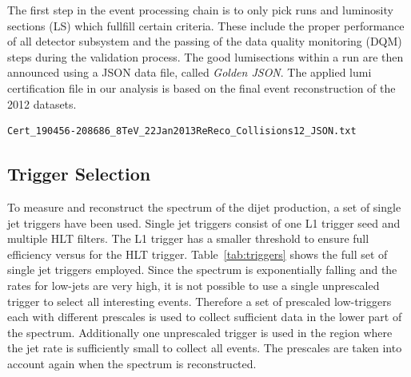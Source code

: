 The first step in the event processing chain is to only pick runs and
luminosity sections (LS) which fullfill certain criteria. These include the
proper performance of all detector subsystem and the passing of the data quality
monitoring (DQM) steps during the validation process. The good lumisections
within a run are then announced using a JSON data file, called \textit{Golden
JSON}. The applied lumi certification file in our analysis is based on the final
event reconstruction of the 2012 datasets.

\begin{verbatim}
Cert_190456-208686_8TeV_22Jan2013ReReco_Collisions12_JSON.txt
\end{verbatim}

\subsection{Trigger Selection}

To measure and reconstruct the \ptavg spectrum of the dijet production, a set of
single jet triggers have been used. Single jet triggers consist of one L1
trigger seed and multiple HLT filters. The L1 trigger has a smaller threshold to
ensure full efficiency versus \pt for the HLT trigger. Table~\ref{tab:triggers}
shows the full set of single jet triggers employed. Since the \pt spectrum is
exponentially falling and the rates for low-\pt jets are very high, it is not
possible to use a single unprescaled trigger to select all interesting events.
Therefore a set of prescaled low-\pt triggers each with different prescales is
used to collect sufficient data in the lower part of the \pt spectrum.
Additionally one unprescaled trigger is used in the region where the jet rate is
sufficiently small to collect all events. The prescales are taken into account
again when the spectrum is reconstructed. 

